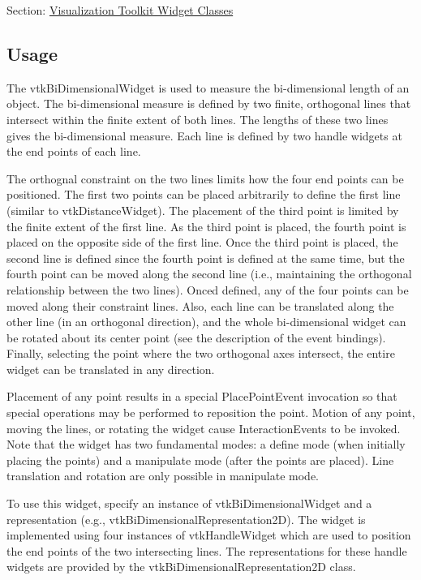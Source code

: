 Section\-: \hyperlink{sec_vtkwidgets}{Visualization Toolkit Widget Classes} \hypertarget{vtkwidgets_vtkxyplotwidget_Usage}{}\subsection{Usage}\label{vtkwidgets_vtkxyplotwidget_Usage}
The vtk\-Bi\-Dimensional\-Widget is used to measure the bi-\/dimensional length of an object. The bi-\/dimensional measure is defined by two finite, orthogonal lines that intersect within the finite extent of both lines. The lengths of these two lines gives the bi-\/dimensional measure. Each line is defined by two handle widgets at the end points of each line.

The orthognal constraint on the two lines limits how the four end points can be positioned. The first two points can be placed arbitrarily to define the first line (similar to vtk\-Distance\-Widget). The placement of the third point is limited by the finite extent of the first line. As the third point is placed, the fourth point is placed on the opposite side of the first line. Once the third point is placed, the second line is defined since the fourth point is defined at the same time, but the fourth point can be moved along the second line (i.\-e., maintaining the orthogonal relationship between the two lines). Onced defined, any of the four points can be moved along their constraint lines. Also, each line can be translated along the other line (in an orthogonal direction), and the whole bi-\/dimensional widget can be rotated about its center point (see the description of the event bindings). Finally, selecting the point where the two orthogonal axes intersect, the entire widget can be translated in any direction.

Placement of any point results in a special Place\-Point\-Event invocation so that special operations may be performed to reposition the point. Motion of any point, moving the lines, or rotating the widget cause Interaction\-Events to be invoked. Note that the widget has two fundamental modes\-: a define mode (when initially placing the points) and a manipulate mode (after the points are placed). Line translation and rotation are only possible in manipulate mode.

To use this widget, specify an instance of vtk\-Bi\-Dimensional\-Widget and a representation (e.\-g., vtk\-Bi\-Dimensional\-Representation2\-D). The widget is implemented using four instances of vtk\-Handle\-Widget which are used to position the end points of the two intersecting lines. The representations for these handle widgets are provided by the vtk\-Bi\-Dimensional\-Representation2\-D class.

